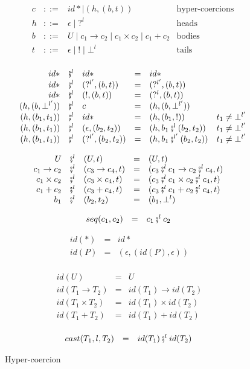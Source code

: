 \documentclass[acmsmall,review,anonymous]{acmart}\settopmatter{printfolios=true,printccs=false,printacmref=false}
\newcommand{\stxrule}[3]{#1 & ::= & #3 & \text{#2}\\}
\newcommand{\funrule}[3]{#1 & = & #2 & #3\\}
\newcommand{\comprule}[4]{#1 & \fatsemi^l & #2 & = & #3 & #4 \\}
\newcommand{\plus}[0]{+}
\begin{document}
\begin{figure}
	\[ 
	\begin{array}{lclr}
	\stxrule{c}{hyper-coercions}{
		id* \mid{}
		( h , ( b , t ) )
	}
	\stxrule{h}{heads}{
		\epsilon \mid{}
		?^l
	}
	\stxrule{b}{bodies}{
		U \mid{}
		c_1 \rightarrow c_2 \mid{}
		c_1 \times c_2 \mid{}
		c_1 \plus c_2
	}
	\stxrule{t}{tails}{
		\epsilon \mid{}
		! \mid{}
		\bot^l
	}
	\end{array}
	\]
	
	\[ 
	\begin{array}{rclclr}
	\comprule{id*}{id*}{
		id*
	}{}
	\comprule{id*}{( ?^{l'} , ( b , t ) )}{
		( ?^{l'} , ( b , t ) )
	}{}
	\comprule{id*}{( ! , ( b , t ) )}{
		(?^{l} , ( b , t))
	}{}
	\comprule{(h , (b ,\bot^{l'}))}{c}{
		(h , (b ,\bot^{l'}))
	}{}
	\comprule{(h , (b_1 , t_1))}{id*}{
		(h , (b_1 , !))
	}{t_1 \neq \bot^{l'}}
	\comprule{(h , (b_1 , t_1))}{(\epsilon , (b_2 , t_2))}{
		(h , b_1 \fatsemi^{l} (b_2 , t_2))
	}{t_1 \neq \bot^{l'}}
	\comprule{(h , (b_1 , t_1))}{(?^{l'} , (b_2 , t_2))}{
		(h , b_1 \fatsemi^{l'} (b_2 , t_2))
	}{t_1 \neq \bot^{l'}}
	\end{array}
	\]
	
	\[ 
	\begin{array}{rclclr}
	\comprule{U}{(U,t)}{
		(U,t)
	}{}
	\comprule{c_1 \rightarrow c_2}{(c_3 \rightarrow c_4,t)}{
		(c_3 \fatsemi^{l} c_1 \rightarrow c_2 \fatsemi^l c_4, t)
	}{}
	\comprule{c_1 \times c_2}{(c_3 \times c_4,t)}{
		(c_3 \fatsemi^{l} c_1 \times c_2 \fatsemi^l c_4, t)
	}{}
	\comprule{c_1 \plus c_2}{(c_3 \plus c_4,t)}{
		(c_3 \fatsemi^{l} c_1 \plus c_2 \fatsemi^l c_4, t)
	}{}
	\comprule{b_1}{(b_2,t_2)}{
		(b_1,\bot^l)
	}{}
	\end{array}
	\]
	
	\[
	\begin{array}{rclr}
	\funrule{seq(c_1,c_2)}{
		c_1 \fatsemi^l c_2
	}{}
	\end{array}
	\]
	
	\[
	\begin{array}{rclr}
	\funrule{id(*)}{
		id*
	}{}
	\funrule{id(P)}{
		(\epsilon,(id(P),\epsilon))
	}{}
	\end{array}
	\]
	
	\[
	\begin{array}{rclr}
	\funrule{id(U)}{U}{}
	\funrule{id(T_1 \rightarrow T_2)}{
		id(T_1) \rightarrow id(T_2)
	}{}
	\funrule{id(T_1 \times T_2)}{
		id(T_1) \times id(T_2)
	}{}
	\funrule{id(T_1 \plus T_2)}{
		id(T_1) \plus id(T_2)
	}{}
	\end{array}
	\]
	
	\[
	\begin{array}{rclr}
	\funrule{cast(T_1,l,T_2)}{
		id(T_1) \fatsemi^l id(T_2)
	}{}
	\end{array}
	\]
	

	\caption{Hyper-coercion}
	\label{fig:HC-syntax}
\end{figure}
\end{document}
